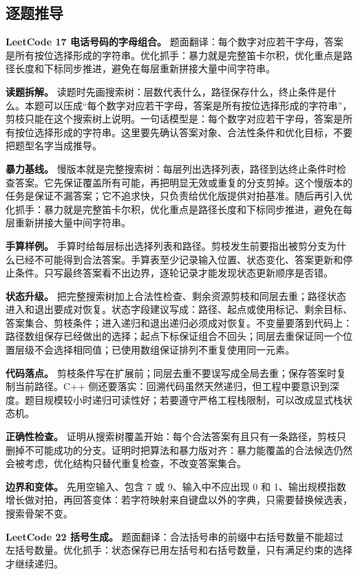 \subsection{逐题推导}

\noindent\textbf{LeetCode 17 电话号码的字母组合。} 题面翻译：每个数字对应若干字母，答案是所有按位选择形成的字符串。优化抓手：暴力就是完整笛卡尔积，优化重点是路径长度和下标同步推进，避免在每层重新拼接大量中间字符串。

\textbf{读题拆解。} 读题时先画搜索树：层数代表什么，路径保存什么，终止条件是什么。本题可以压成“每个数字对应若干字母，答案是所有按位选择形成的字符串”，剪枝只能在这个搜索树上说明。一句话模型是：每个数字对应若干字母，答案是所有按位选择形成的字符串。这里要先确认答案对象、合法性条件和优化目标，不要把题型名字当成推导。

\textbf{暴力基线。} 慢版本就是完整搜索树：每层列出选择列表，路径到达终止条件时检查答案。它先保证覆盖所有可能，再把明显无效或重复的分支剪掉。这个慢版本的任务是保证不漏答案；它不追求快，只负责给优化版提供对拍基准。随后再引入优化抓手：暴力就是完整笛卡尔积，优化重点是路径长度和下标同步推进，避免在每层重新拼接大量中间字符串。

\textbf{手算样例。} 手算时给每层标出选择列表和路径。剪枝发生前要指出被剪分支为什么已经不可能得到合法答案。手算表至少记录输入位置、状态变化、答案更新和停止条件。只写最终答案看不出边界，逐轮记录才能发现状态更新顺序是否错。

\textbf{状态升级。} 把完整搜索树加上合法性检查、剩余资源剪枝和同层去重；路径状态进入和退出要成对恢复。状态字段建议写成：路径、起点或使用标记、剩余目标、答案集合、剪枝条件；进入递归和退出递归必须成对恢复。不变量要落到代码上：路径数组保存已经做出的选择；起点下标保证组合不回头；同层去重保证同一个位置层级不会选择相同值；已使用数组保证排列不重复使用同一元素。

\textbf{代码落点。} 剪枝条件写在扩展前；同层去重不要误写成全局去重；保存答案时复制当前路径。C++ 侧还要落实：回溯代码虽然天然递归，但工程中要意识到深度。题目规模较小时递归可读性好；若要遵守严格工程栈限制，可以改成显式栈状态机。

\textbf{正确性检查。} 证明从搜索树覆盖开始：每个合法答案有且只有一条路径，剪枝只删掉不可能成功的分支。证明时把算法和暴力版对齐：暴力能覆盖的合法候选仍然会被考虑，优化结构只替代重复检查，不改变答案集合。

\textbf{边界和变体。} 先用空输入、包含 7 或 9、输入中不应出现 0 和 1、输出规模指数增长做对拍，再回答变体：若字符映射来自键盘以外的字典，只需要替换候选表，搜索骨架不变。

\noindent\textbf{LeetCode 22 括号生成。} 题面翻译：合法括号串的前缀中右括号数量不能超过左括号数量。优化抓手：状态保存已用左括号和右括号数量，只有满足约束的选择才继续递归。


